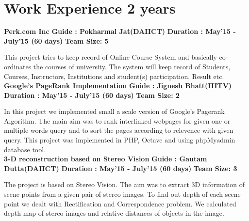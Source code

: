 \documentclass{article}
\begin{document}
\vspace*{.1cm}
\section{Work Experience 2 years}
\textbf{\large{Perk.com Inc}} \hspace*{6cm} \textbf{Guide : Pokharmal Jat(DAIICT)}
\textbf{Duration : May'15 - July'15 (60 days)} \hspace*{5.7cm} \textbf{Team Size: 5}

\vspace*{.051mm}
\hspace*{2.6mm} This project tries to keep record of Online Course System and basically co-ordinates the courses of university. The system will keep record of Students, Courses, Instructors, Institutions and student(s) participation, Result etc.\\

\textbf{\large{Google's PageRank Implementation}} \hspace*{6cm} \textbf{Guide : Jignesh Bhatt(IIITV)}
\textbf{Duration : May'15 - July'15 (60 days)}\hspace*{5.5cm} \textbf{Team Size: 2}

\vspace*{.051mm}
\hspace*{2.6mm} In this project we implemented small a scale version of Google's Pagerank Algorithm. The main aim was to rank interlinked webpages for given one or multiple words query and to sort the pages according to relevence with given query. This project was implemented in PHP, Octave and using phpMyadmin database tool.\\

\textbf{\large{3-D reconstruction based on Stereo Vision}} \hspace*{3.6cm} \textbf{Guide : Gautam Dutta(DAIICT)}
\textbf{Duration : May'15 - July'15 (60 days)} \hspace*{4.7cm} \textbf{Team Size: 3}

\vspace*{.051mm}
\hspace*{2.6mm} The project is based on Stereo Vision. The aim was to extract 3D information of scene points from a given pair of stereo images. To find out depth of each scene point we dealt with Rectification and Correspondence problem. We calculated depth map of stereo images and relative distances of objects in the image.

\vspace*{.5cm}
\end{document}
